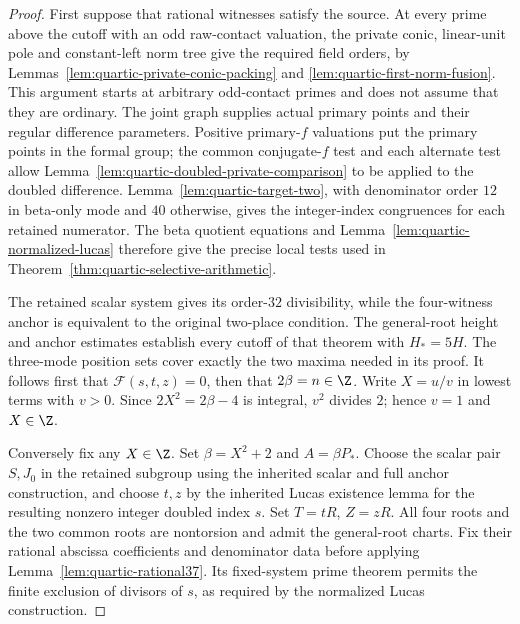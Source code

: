 \begin{proof}
First suppose that rational witnesses satisfy the source. At every prime
above the cutoff with an odd raw-contact valuation, the private conic,
linear-unit pole and constant-left norm tree give the required field
orders, by Lemmas~\ref{lem:quartic-private-conic-packing} and
\ref{lem:quartic-first-norm-fusion}. This argument starts at arbitrary
odd-contact primes and does not assume that they are ordinary. The joint
graph supplies actual primary points and their regular difference
parameters. Positive primary-$f$ valuations put the primary points in the
formal group; the common conjugate-$f$ test and each alternate test allow
Lemma~\ref{lem:quartic-doubled-private-comparison} to be applied to the
doubled difference. Lemma~\ref{lem:quartic-target-two}, with denominator
order $12$ in beta-only mode and $40$ otherwise, gives the integer-index
congruences for each retained numerator. The beta quotient equations and
Lemma~\ref{lem:quartic-normalized-lucas} therefore give the precise local
tests used in Theorem~\ref{thm:quartic-selective-arithmetic}.

The retained scalar system gives its order-$32$ divisibility, while the
four-witness anchor is equivalent to the original two-place condition.
The general-root height and anchor estimates establish every cutoff of
that theorem with $H_*=5H$. The three-mode position sets cover exactly
the two maxima needed in its proof. It follows first that
$\mathcal F(s,t,z)=0$, then that $2\beta=n\in\Z$. Write $X=u/v$ in
lowest terms with $v>0$. Since $2X^2=2\beta-4$ is integral, $v^2$ divides
$2$; hence $v=1$ and $X\in\Z$.

Conversely fix any $X\in\Z$. Set $\beta=X^2+2$ and $A=\beta P_*$.
Choose the scalar pair $S,J_0$ in the retained subgroup using the
inherited scalar and full anchor construction, and choose $t,z$ by the
inherited Lucas existence lemma for the resulting nonzero integer doubled
index $s$. Set $T=tR$, $Z=zR$. All four roots and the two common roots
are nontorsion and admit the general-root charts. Fix their rational
abscissa coefficients and denominator data before applying
Lemma~\ref{lem:quartic-rational37}. Its fixed-system prime theorem permits
the finite exclusion of divisors of $s$, as required by the normalized
Lucas construction.


\end{proof}
